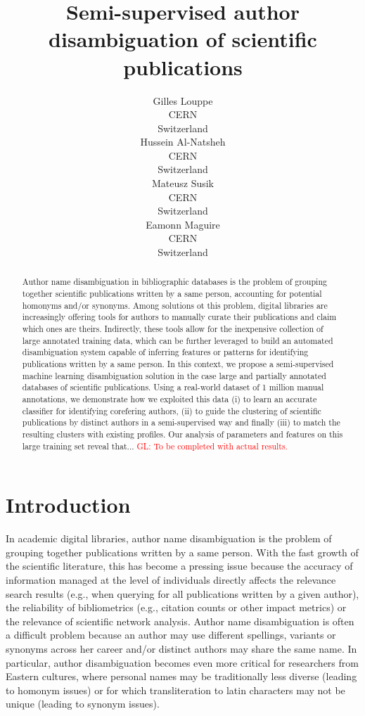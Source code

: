 \documentclass{article}
\title{Semi-supervised author disambiguation of scientific publications}
\author{Gilles Louppe\\
        CERN\\
        Switzerland\\
\And Hussein Al-Natsheh\\
        CERN\\
        Switzerland\\
\And Mateusz Susik\\
        CERN\\
        Switzerland\\
\And Eamonn Maguire\\
        CERN\\
        Switzerland}
\date{}
\newcommand{\glnote}[1]{\textcolor{red}{GL: #1}}
\begin{document}
\maketitle

\begin{abstract}

Author name disambiguation in bibliographic databases is the problem of
grouping together scientific publications written by a same person, accounting
for potential homonyms and/or synonyms. Among solutions ot this problem, digital
libraries are increasingly offering tools for authors to manually curate their
publications and claim which ones are theirs. Indirectly, these tools allow for
the inexpensive collection of large annotated training data, which can be
further leveraged to build an automated disambiguation system capable of
inferring features or patterns for identifying publications written by a same
person.  In this context, we propose a semi-supervised machine learning
disambiguation solution in the case large and partially annotated databases of
scientific publications. Using a real-world dataset of 1 million manual
annotations, we demonstrate how we exploited this data (i) to learn an accurate
classifier for identifying corefering authors, (ii) to guide the clustering of
scientific publications by distinct authors in a semi-supervised way and
finally (iii) to match the resulting clusters with existing profiles.  Our
analysis of parameters and features on this large training set reveal that...
\glnote{To be completed with actual results.}

\end{abstract}



\section{Introduction}
\label{introduction}


In academic digital libraries, author name disambiguation is the problem of
grouping together publications written by a same person.  With the fast growth
of the scientific literature, this has become a pressing issue because the
accuracy of information managed at the level of individuals directly affects
the relevance search results (e.g., when querying for all publications written
by a given author), the reliability of bibliometrics (e.g., citation counts or
other impact metrics) or the relevance of scientific network analysis. Author
name disambiguation is often a difficult problem because an author may use
different spellings, variants or synonyms across her career and/or distinct
authors may share the same name. In particular, author disambiguation becomes
even more critical for researchers from Eastern cultures, where personal names
may be traditionally less diverse (leading to homonym issues) or for which
transliteration to latin characters may not be unique (leading to synonym
issues).
\end{document}
